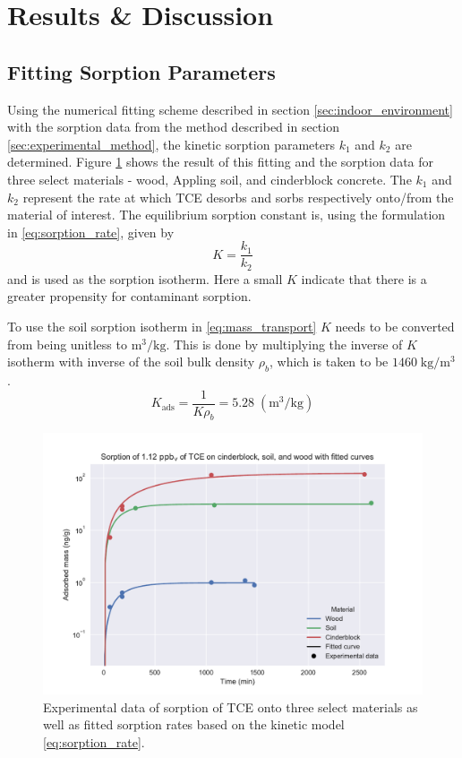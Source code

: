 \section{Results \& Discussion}\label{sec:results}

\subsection{Fitting Sorption Parameters}\label{sec:results_sorption_fit}

Using the numerical fitting scheme described in section \ref{sec:indoor_environment} with the sorption data from the method described in section \ref{sec:experimental_method}, the kinetic sorption parameters $k_1$ and $k_2$ are determined.
Figure \ref{fig:sorption_fit} shows the result of this fitting and the sorption data for three select materials - wood, Appling soil, and cinderblock concrete.
The $k_1$ and $k_2$ represent the rate at which TCE desorbs and sorbs respectively onto/from the material of interest.
The equilibrium sorption constant is, using the formulation in \eqref{eq:sorption_rate}, given by
\begin{equation}
  K = \frac{k_1}{k_2}
\end{equation}
and is used as the sorption isotherm.
Here a small $K$ indicate that there is a greater propensity for contaminant sorption.\par

To use the soil sorption isotherm in \eqref{eq:mass_transport} $K$ needs to be converted from being unitless to $\mathrm{m^3/kg}$.
This is done by multiplying the inverse of $K$ isotherm with inverse of the soil bulk density $\rho_b$, which is taken to be $1460 \; \mathrm{kg/m^3}$.
\begin{equation}
  K_\mathrm{ads} = \frac{1}{K \rho_b} = 5.28 \; \mathrm{(m^3/kg)}
\end{equation}

\begin{figure}[htb!]
  \includegraphics[width=\textwidth]{sorption_fit.pdf}
  \caption{Experimental data of sorption of TCE onto three select materials as well as fitted sorption rates based on the kinetic model \eqref{eq:sorption_rate}.}
  \label{fig:sorption_fit}
\end{figure}

